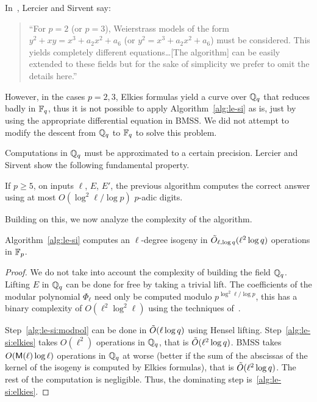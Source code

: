 \begin{nota}
  In~\cite{lercier+sirvent08}, Lercier and Sirvent say:
  \begin{quote}
    ``For $p = 2$ (or $p = 3$), Weierstrass models of the form $y^2 + xy
    = x^3 + a_2 x^2 + a_6$ (or $y^2 = x^3 + a_2 x^2 + a_6$) must be
    considered. This yields completely different equations\dots [The
    algorithm] can be easily extended to these fields but for the
    sake of simplicity we prefer to omit the details here.''
  \end{quote}
  
  However, in the cases $p=2,3$, Elkies formulas yield a curve over
  $\mathbb{Q}_q$ that reduces badly in $\mathbb{F}_q$, thus it is not possible to
  apply Algorithm~\ref{alg:le-si} as is, just by using the appropriate
  differential equation in BMSS. We did not attempt to modify the
  descent from $\mathbb{Q}_q$ to $\mathbb{F}_q$ to solve this problem.
\end{nota}

Computations in $\mathbb{Q}_q$ must be approximated to a certain
precision. Lercier and Sirvent show the following fundamental
property.

\begin{proposition}
  If $p\ge5$, on inputs $\ell$, $E$, $E'$, the previous algorithm
  computes the correct answer using at most $O(\log^2\ell/\log p)$
  $p$-adic digits.
\end{proposition}

Building on this, we now analyze the complexity of the algorithm.

\begin{proposition}
  \label{th:lercier-sirvent}
  Algorithm~\ref{alg:le-si} computes an $\ell$-degree isogeny in
  $\tilde{O}_{\ell,\log q}(\ell^2\log q)$ operations in $\mathbb{F}_p$.
\end{proposition}
\begin{proof}
  We do not take into account the complexity of building the field
  $\mathbb{Q}_q$. Lifting $E$ in $\mathbb{Q}_q$ can be done for free by taking a
  trivial lift. The coefficients of the modular polynomial $\Phi_\ell$
  need only be computed modulo $p^{\log^2\ell/\log p}$, this has a
  binary complexity of $O(\ell^2\log^2\ell)$ using the techniques
  of~\cite{sutherland10:modpol}.

  Step~\ref{alg:le-si:modpol} can be done in $\tilde{O}(\ell\log q)$
  using Hensel lifting. Step~\ref{alg:le-si:elkies} takes $O(\ell^2)$
  operations in $\mathbb{Q}_q$, that is $\tilde{O}(\ell^2\log q)$. BMSS takes
  $O(\mathsf{M}(\ell)\log\ell)$ operations in $\mathbb{Q}_q$ at worse (better if
  the sum of the abscissas of the kernel of the isogeny is computed by
  Elkies formulas), that is $\tilde{O}(\ell^2\log q)$. The rest of the
  computation is negligible. Thus, the dominating step
  is~\ref{alg:le-si:elkies}.
\end{proof}

